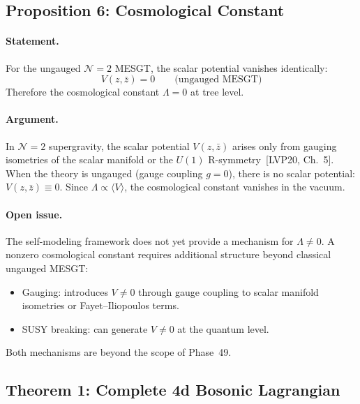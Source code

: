 
\subsection*{Proposition 6: Cosmological Constant}

\paragraph{Statement.}
For the ungauged $\mathcal{N}=2$ MESGT, the scalar potential vanishes
identically:
\begin{equation}\tag{49.5}
  V(z, \bar{z}) = 0 \qquad \text{(ungauged MESGT)}
\end{equation}
Therefore the cosmological constant $\Lambda = 0$ at tree level.

\paragraph{Argument.}
In $\mathcal{N}=2$ supergravity, the scalar potential $V(z, \bar{z})$
arises only from gauging isometries of the scalar manifold or the
$U(1)$ R-symmetry~[LVP20, Ch.~5]. When the theory is ungauged
(gauge coupling $g = 0$), there is no scalar potential:
$V(z, \bar{z}) \equiv 0$. Since $\Lambda \propto \langle V \rangle$,
the cosmological constant vanishes in the vacuum.

\paragraph{Open issue.}
The self-modeling framework does not yet provide a mechanism for
$\Lambda \neq 0$. A nonzero cosmological constant requires
additional structure beyond classical ungauged MESGT:
\begin{itemize}
\item Gauging: introduces $V \neq 0$ through gauge coupling to scalar
  manifold isometries or Fayet--Iliopoulos terms.
\item SUSY breaking: can generate $V \neq 0$ at the quantum level.
\end{itemize}
Both mechanisms are beyond the scope of Phase~49.


\subsection*{Theorem 1: Complete 4d Bosonic Lagrangian}

